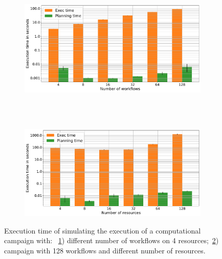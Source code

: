 \begin{figure}[t]
    \centering
    \begin{subfigure}[b]{0.75\textwidth}
        \includegraphics[width=.95\textwidth]{figures/manager/SimTimeWork.pdf}
        \caption{}
        \label{fig:SimTimeWork}
    \end{subfigure}\\
    ~ 
    \begin{subfigure}[b]{0.75\textwidth}
        \includegraphics[width=.95\textwidth]{figures/manager/SimTimeRes.pdf}
        \caption{}
        \label{fig:SimTimeRes}
    \end{subfigure}
    \caption{Execution time of simulating the execution of a computational campaign with: ~\ref{fig:SimTimeWork}) different number of workflows on 4 resources;~\ref{fig:SimTimeRes}) campaign with 128 workflows and different number of resources.}
    \label{fig:cm_char}
\end{figure}


